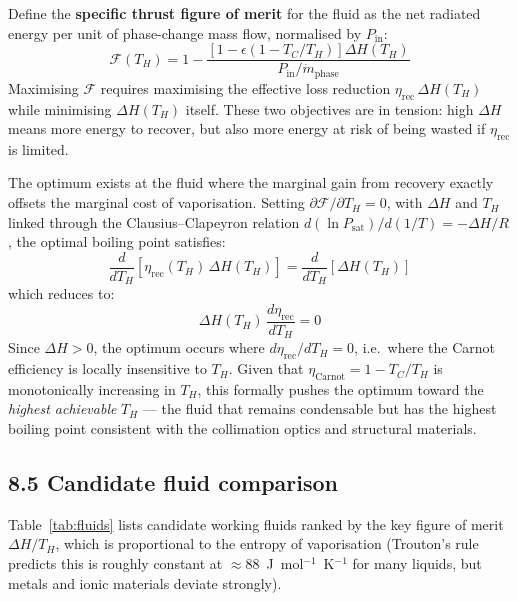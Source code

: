 \documentclass[12pt]{article}
\begin{document}
Define the \textbf{specific thrust figure of merit} for the fluid as the
net radiated energy per unit of phase-change mass flow, normalised by
$P_{\mathrm{in}}$:
\[
  \mathcal{F}(T_H) =
  1 -
  \frac{\left[1 - \epsilon\!\left(1 - T_C/T_H\right)\right]\Delta H(T_H)}
       {P_{\mathrm{in}}/\dot{m}_{\mathrm{phase}}}
\]
Maximising $\mathcal{F}$ requires maximising the effective loss reduction
$\eta_{\mathrm{rec}}\,\Delta H(T_H)$ while minimising $\Delta H(T_H)$ itself.
These two objectives are in tension: high $\Delta H$ means more energy to
recover, but also more energy at risk of being wasted if $\eta_{\mathrm{rec}}$
is limited.

The optimum exists at the fluid where the marginal gain from recovery exactly
offsets the marginal cost of vaporisation. Setting
$\partial \mathcal{F}/\partial T_H = 0$, with $\Delta H$ and $T_H$ linked
through the Clausius--Clapeyron relation
$d(\ln P_{\mathrm{sat}})/d(1/T) = -\Delta H / R$, the optimal boiling
point satisfies:
\[
  \frac{d}{dT_H}\!\left[\eta_{\mathrm{rec}}(T_H)\,\Delta H(T_H)\right]
  = \frac{d}{dT_H}\!\left[\Delta H(T_H)\right]
\]
which reduces to:
\[
  \Delta H(T_H)\,\frac{d\eta_{\mathrm{rec}}}{dT_H} = 0
\]
Since $\Delta H > 0$, the optimum occurs where $d\eta_{\mathrm{rec}}/dT_H = 0$,
i.e.\ where the Carnot efficiency is locally insensitive to $T_H$. Given that
$\eta_{\mathrm{Carnot}} = 1 - T_C/T_H$ is monotonically increasing in $T_H$,
this formally pushes the optimum toward the \emph{highest achievable} $T_H$
--- the fluid that remains condensable but has the highest boiling point
consistent with the collimation optics and structural materials.

\subsection*{8.5 Candidate fluid comparison}

Table~\ref{tab:fluids} lists candidate working fluids ranked by the
key figure of merit $\Delta H / T_H$, which is proportional to the entropy
of vaporisation (Trouton's rule predicts this is roughly constant at
$\approx 88$~J~mol$^{-1}$~K$^{-1}$ for many liquids, but metals and
ionic materials deviate strongly).
\end{document}
